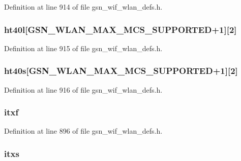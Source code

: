 Definition at line 914 of file gsn\_\-wif\_\-wlan\_\-defs.h.

\hypertarget{a00410_ab42c2405c4fac47ff38d981b9ebcb346}{
\subsubsection[{ht40l}]{ {\bf ht40l}\mbox{[}GSN\_\-WLAN\_\-MAX\_\-MCS\_\-SUPPORTED+1\mbox{]}\mbox{[}2\mbox{]}}}
\label{a00410_ab42c2405c4fac47ff38d981b9ebcb346}


Definition at line 915 of file gsn\_\-wif\_\-wlan\_\-defs.h.

\hypertarget{a00410_abb9b5107f666672351985f8fc94b7f54}{
\subsubsection[{ht40s}]{ {\bf ht40s}\mbox{[}GSN\_\-WLAN\_\-MAX\_\-MCS\_\-SUPPORTED+1\mbox{]}\mbox{[}2\mbox{]}}}
\label{a00410_abb9b5107f666672351985f8fc94b7f54}


Definition at line 916 of file gsn\_\-wif\_\-wlan\_\-defs.h.

\hypertarget{a00410_a2d2ab651bfccb98b887ad2229160e7fa}{
\subsubsection[{itxf}]{ {\bf itxf}}}
\label{a00410_a2d2ab651bfccb98b887ad2229160e7fa}


Definition at line 896 of file gsn\_\-wif\_\-wlan\_\-defs.h.

\hypertarget{a00410_af37d80975c1e392ee6e0d7716dd25d1f}{
\subsubsection[{itxs}]{ {\bf itxs}}}
\label{a00410_af37d80975c1e392ee6e0d7716dd25d1f}


